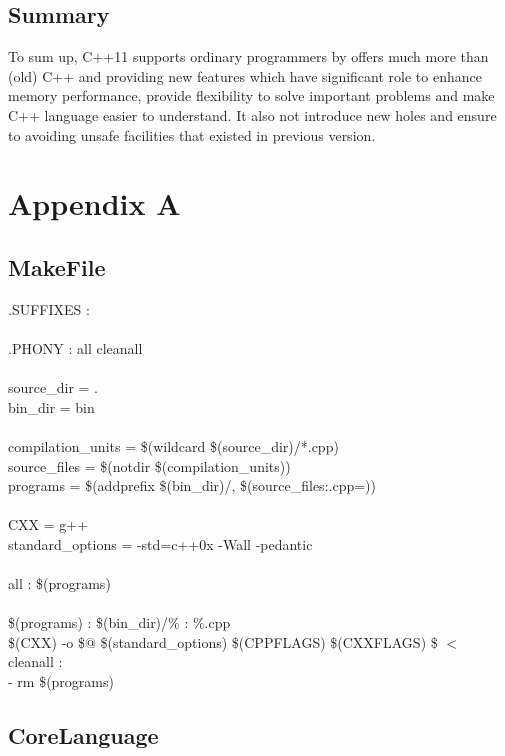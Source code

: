 \documentclass[12pt]{report}
\begin{document}
\section{Summary}
\label{section: summary}

To sum up, C++11 supports ordinary programmers by offers much more than (old) C++  and  providing new features which have significant role to enhance memory performance, provide flexibility to solve important problems and make C++ language easier to understand. It also not introduce new holes and  ensure to avoiding unsafe facilities that existed in previous version.


\label{References}

	


\appendix
\chapter{Appendix A}
\section{MakeFile}
\label{Makefile}
.SUFFIXES : \\ \\
.PHONY : all cleanall \\ \\
source\_dir = .\\ 
bin\_dir = bin \\ \\
compilation\_units = \$(wildcard \$(source\_dir)/*.cpp)\\
source\_files = \$(notdir \$(compilation\_units))\\
programs = \$(addprefix \$(bin\_dir)/, \$(source\_files:.cpp=))\\ \\
CXX = g++ \\
standard\_options = -std=c++0x -Wall -pedantic \\ \\
all : \$(programs)\\ \\
\$(programs) : \$(bin\_dir)/\% : \%.cpp \\
\$(CXX) -o \$@ \$(standard\_options) \$(CPPFLAGS) \$(CXXFLAGS) \$ $<$ \\

cleanall : \\
- rm \$(programs)

\section{CoreLanguage}
\label{Appendix: corelanguage}
\end{document}
